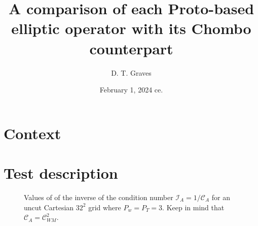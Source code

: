 \documentclass{article}
\newcommand{\cali}{\mathcal{I}}
\newcommand{\calc}{\mathcal{C}}
\begin{document}
\title{A comparison of each Proto-based elliptic operator with its Chombo counterpart}
\author{D. T. Graves   }
\date{February 1, 2024 ce.}

\maketitle


\section{Context}



\section{Test description}
\begin{figure}
\centerline{ }
\label{fig::T3W3}
\caption
    {   Values of of the inverse of the condition number
      $\cali_A = 1/\calc_A$
      for an uncut Cartesian $32^2$
      grid where $P_w = P_T = 3$.
      Keep in mind that $\calc_A = \calc^2_{WM}$.
    }
\end{figure}
\end{document}
